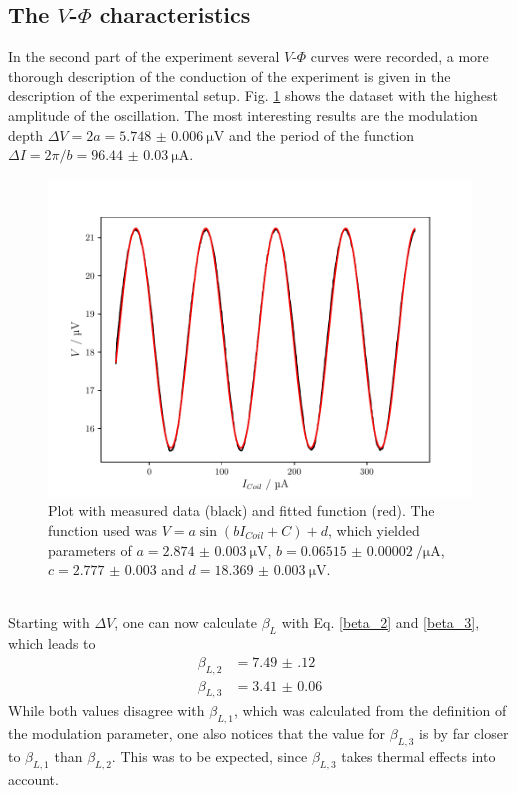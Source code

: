 \documentclass[a4paper,10pt]{article}
\begin{document}
\subsection{The $V$-$\Phi$ characteristics}
\label{sec_v_phi}
In the second part of the experiment several $V$-$\Phi$ curves were recorded, a more thorough description of the conduction of the experiment is given in the description of the experimental setup. Fig. \ref{fig_iphi_characteristics} shows the dataset with the highest amplitude of the oscillation. The most interesting results are the modulation depth $\Delta V = 2 a = \SI{5.748(6)}{\micro \volt}$ and the period of the function $\Delta I = 2 \pi / b = \SI{96.44(3)}{\micro \ampere}$. 
\begin{figure}[htp!]
    \centering
    \includegraphics[width = 0.6 \textwidth]{v_flux.pdf}
    \caption{Plot with measured data (black) and fitted function (red). The function used was $V = a \sin(b I_{Coil} + C) + d$, which yielded parameters of $a = \SI{2.874(3)}{\micro \volt}$, $b = \SI{0.06515(2)}{\per \micro \ampere}$, $c = \num{2.777(3)}$ and $d = \SI{18.369(3)}{\micro \volt}$.}
    \label{fig_iphi_characteristics}
\end{figure}
\\
Starting with $\Delta V$, one can now calculate $\beta_L$ with Eq. \ref{beta_2} and \ref{beta_3}, which leads to 
\begin{equation*}
    \begin{split}
        \beta_{L,2} &= \num{7.49(12)} \\
        \beta_{L,3} &= \num{3.41(6)}
    \end{split}
\end{equation*}
While both values disagree with $\beta_{L,1}$, which was calculated from the definition of the modulation parameter, one also notices that the value for $\beta_{L,3}$ is by far closer to $\beta_{L,1}$ than $\beta_{L,2}$. This was to be expected, since $\beta_{L,3}$ takes thermal effects into account.
\end{document}
